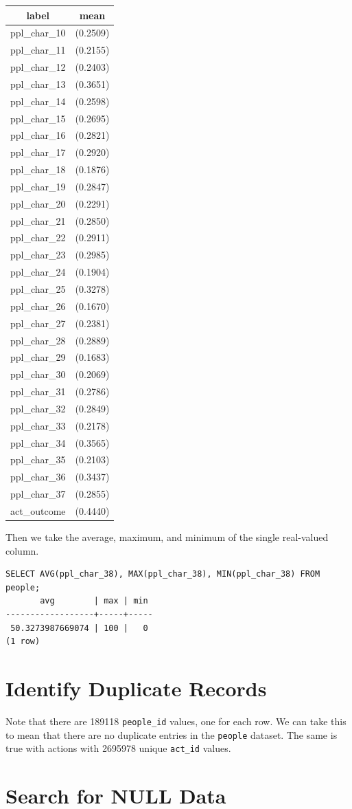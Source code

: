 \documentclass[]{report}
\begin{document}
\begin{longtable}[]{@{}cc@{}}
\toprule
label & mean\tabularnewline
\midrule
\endhead
ppl\_char\_10 & (0.2509)\tabularnewline
ppl\_char\_11 & (0.2155)\tabularnewline
ppl\_char\_12 & (0.2403)\tabularnewline
ppl\_char\_13 & (0.3651)\tabularnewline
ppl\_char\_14 & (0.2598)\tabularnewline
ppl\_char\_15 & (0.2695)\tabularnewline
ppl\_char\_16 & (0.2821)\tabularnewline
ppl\_char\_17 & (0.2920)\tabularnewline
ppl\_char\_18 & (0.1876)\tabularnewline
ppl\_char\_19 & (0.2847)\tabularnewline
ppl\_char\_20 & (0.2291)\tabularnewline
ppl\_char\_21 & (0.2850)\tabularnewline
ppl\_char\_22 & (0.2911)\tabularnewline
ppl\_char\_23 & (0.2985)\tabularnewline
ppl\_char\_24 & (0.1904)\tabularnewline
ppl\_char\_25 & (0.3278)\tabularnewline
ppl\_char\_26 & (0.1670)\tabularnewline
ppl\_char\_27 & (0.2381)\tabularnewline
ppl\_char\_28 & (0.2889)\tabularnewline
ppl\_char\_29 & (0.1683)\tabularnewline
ppl\_char\_30 & (0.2069)\tabularnewline
ppl\_char\_31 & (0.2786)\tabularnewline
ppl\_char\_32 & (0.2849)\tabularnewline
ppl\_char\_33 & (0.2178)\tabularnewline
ppl\_char\_34 & (0.3565)\tabularnewline
ppl\_char\_35 & (0.2103)\tabularnewline
ppl\_char\_36 & (0.3437)\tabularnewline
ppl\_char\_37 & (0.2855)\tabularnewline
act\_outcome & (0.4440)\tabularnewline
\bottomrule
\end{longtable}

Then we take the average, maximum, and minimum of the single real-valued
column.

\begin{verbatim}
SELECT AVG(ppl_char_38), MAX(ppl_char_38), MIN(ppl_char_38) FROM people;
       avg        | max | min
------------------+-----+-----
 50.3273987669074 | 100 |   0
(1 row)
\end{verbatim}

\chapter{Identify Duplicate Records}\label{identify-duplicate-records}

Note that there are 189118 \texttt{people\_id} values, one for each row.
We can take this to mean that there are no duplicate entries in the
\texttt{people} dataset. The same is true with actions with 2695978
unique \texttt{act\_id} values.

\chapter{Search for NULL Data}\label{search-for-null-data}
\end{document}
